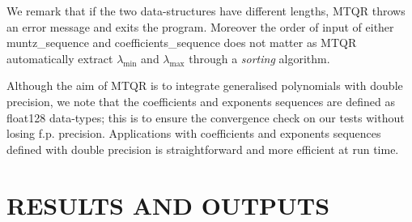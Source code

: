 \documentclass[a4paper, twosided]{book}
\begin{document}
\noindent
We remark that if the two data-structures have different lengths, MTQR throws an error message and exits the program. Moreover the order of input of either \colorbox{poliGrayBlue}{muntz\_sequence} and \colorbox{poliGrayBlue}{coefficients\_sequence} does not matter as MTQR automatically extract $\lambda_{\text{min}}$ and $\lambda_{\text{max}}$ through a \textsl{sorting} algorithm.



\noindent
Although the aim of MTQR is to integrate generalised polynomials with double precision, we note that the coefficients and exponents sequences are defined as \colorbox{poliGrayBlue}{float128} data-types; this is to ensure the convergence check on our tests without losing f.p. precision. Applications with coefficients and exponents sequences defined with double precision is straightforward and more efficient at run time.

\section[Results and outputs]{\changefont RESULTS AND OUTPUTS}\label{Sec3.2}
\end{document}
